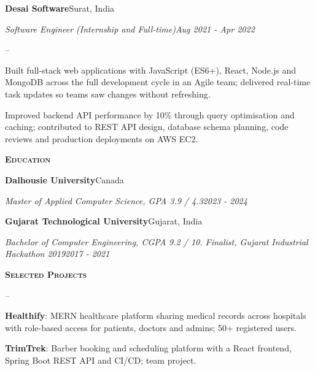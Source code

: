 \documentclass[10pt,letterpaper]{article}
\newcommand{\resumesection}[1]{%
  \vspace{5pt}%
  {\large\bfseries\scshape #1}\par
  \vspace{1pt}{\color{rule}\hrule height 0.6pt}\vspace{3pt}%
}
\newcommand{\roleheading}[4]{%
  \vspace{2pt}%
  \textbf{#1}\hfill #2\par
  \textit{#3}\hfill \textit{#4}\par
  \vspace{1pt}%
}
\newenvironment{bullets}{%
  \begin{list}{--}{%
    \setlength{\leftmargin}{14pt}\setlength{\labelwidth}{8pt}\setlength{\labelsep}{6pt}%
    \setlength{\itemsep}{1pt}\setlength{\parsep}{0pt}\setlength{\topsep}{2pt}\setlength{\partopsep}{0pt}}%
}{\end{list}}
\begin{document}
\roleheading{Desai Software}{Surat, India}{Software Engineer (Internship and Full-time)}{Aug 2021 - Apr 2022}
\begin{bullets}
  \item Built full-stack web applications with JavaScript (ES6+), React, Node.js and MongoDB across the full development cycle in an Agile team; delivered real-time task updates so teams saw changes without refreshing.
  \item Improved backend API performance by 10\% through query optimisation and caching; contributed to REST API design, database schema planning, code reviews and production deployments on AWS EC2.
\end{bullets}

\resumesection{Education}
\roleheading{Dalhousie University}{Canada}{Master of Applied Computer Science, GPA 3.9 / 4.3}{2023 - 2024}
\roleheading{Gujarat Technological University}{Gujarat, India}{Bachelor of Computer Engineering, CGPA 9.2 / 10. Finalist, Gujarat Industrial Hackathon 2019}{2017 - 2021}

\resumesection{Selected Projects}
\begin{bullets}
  \item \textbf{Healthify}: MERN healthcare platform sharing medical records across hospitals with role-based access for patients, doctors and admins; 50+ registered users.
  \item \textbf{TrimTrek}: Barber booking and scheduling platform with a React frontend, Spring Boot REST API and CI/CD; team project.
\end{bullets}
\end{document}

